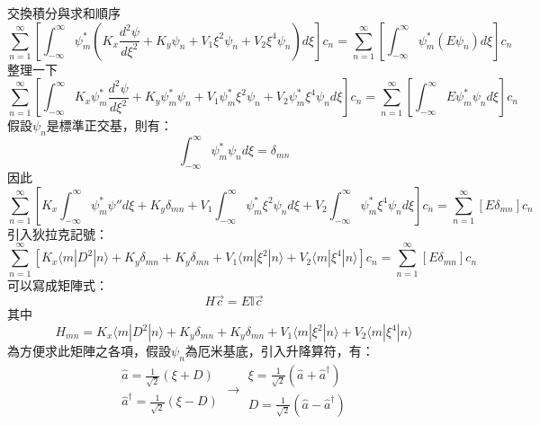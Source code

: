 \documentclass[12pt]{article}
\begin{document}
交換積分與求和順序
\begin{equation}
    \sum_{n=1}^{\infty}{\left[\int_{-\infty}^{\infty}{\psi_m^*\left(K_x\frac{d^2\psi}{d\xi^2}+K_y\psi_n+V_1\xi^2\psi_n+V_2\xi^4\psi_n\right)}d\xi\right]c_n}=\sum_{n=1}^{\infty}{\left[\int_{-\infty}^{\infty}{\psi_m^*\left(E\psi_n\right)}d\xi\right]c_n}
\end{equation}
整理一下
\begin{equation}
    \sum_{n=1}^{\infty}{\left[\int_{-\infty}^{\infty}{K_x\psi_m^*\frac{d^2\psi}{d\xi^2}+K_y\psi_m^*\psi_n+V_1\psi_m^*\xi^2\psi_n+V_2\psi_m^*\xi^4\psi_n}d\xi\right]c_n}=\sum_{n=1}^{\infty}{\left[\int_{-\infty}^{\infty}{E\psi_m^*\psi_n}d\xi\right]c_n}
\end{equation}
假設$\psi_n$是標準正交基，則有：
\begin{equation}
    \int_{-\infty}^{\infty}{\psi_m^*\psi_n}d\xi=\delta_{mn}
\end{equation}
因此
\begin{equation}
    \sum_{n=1}^{\infty}{\left[K_x\int_{-\infty}^{\infty}{\psi_m^*\psi''}d\xi+K_y\delta_{mn}+V_1\int_{-\infty}^{\infty}{\psi_m^*\xi^2\psi_n}d\xi+V_2\int_{-\infty}^{\infty}{\psi_m^*\xi^4\psi_n}d\xi\right]c_n}=\sum_{n=1}^{\infty}{\left[E\delta_{mn}\right]c_n}
\end{equation}
引入狄拉克記號：
\begin{equation}
    \sum_{n=1}^{\infty}{\left[K_x\langle m|D^2|n\rangle+K_y\delta_{mn}+K_y\delta_{mn}+V_1\langle m|\xi^2|n\rangle+V_2\langle m|\xi^4|n\rangle\right]c_n}=\sum_{n=1}^{\infty}{\left[E\delta_{mn}\right]c_n}
\end{equation}
可以寫成矩陣式：
\begin{equation}
    H\vec{c}=E\mathbb{I}\vec{c}
\end{equation}
其中
\begin{equation}
    H_{mn}=K_x\langle m|D^2|n\rangle+K_y\delta_{mn}+K_y\delta_{mn}+V_1\langle m|\xi^2|n\rangle+V_2\langle m|\xi^4|n\rangle
\end{equation}
為方便求此矩陣之各項，假設$\psi_n$為厄米基底，引入升降算符，有：
\begin{equation}
    \begin{aligned}
        \hat{a}=\frac{1}{\sqrt{2}}(\xi+D) \\
        \hat{a}^\dagger=\frac{1}{\sqrt{2}}(\xi-D)
    \end{aligned}
    \to
    \begin{aligned}
         \xi=\frac{1}{\sqrt{2}}(\hat{a}+\hat{a}^\dagger)  \\
          D=\frac{1}{\sqrt{2}}(\hat{a}-\hat{a}^\dagger)
    \end{aligned}
\end{equation}
\end{document}
